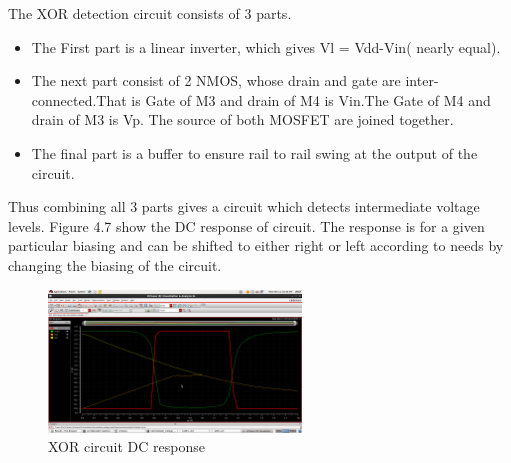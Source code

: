The XOR detection circuit consists of 3 parts.

\begin{itemize}
    \item The First part is a linear inverter, which gives Vl = Vdd-Vin( nearly equal).
    \item The next part consist of 2 NMOS, whose drain and gate are inter-connected.That is Gate of M3 and drain of M4 is Vin.The Gate of M4 and drain of M3 is Vp. The source of both MOSFET are joined together. 
    \item The final part is a buffer to ensure rail to rail swing at the output of the circuit.
\end{itemize}

Thus combining all 3 parts gives a circuit which detects intermediate voltage levels. Figure 4.7 show the DC response of circuit. The response is for a given particular biasing and can be shifted to either right or left according to needs by changing the biasing of the circuit. 

\begin{figure}[h]
    \centering
    \includegraphics[width=0.6\textwidth]{xor_dc.png}
    \caption{XOR circuit DC response}
    \label{fig:mesh1}
\end{figure}

